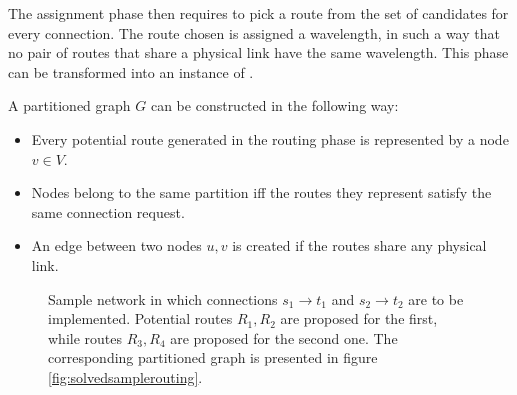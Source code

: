 The assignment phase then requires to pick a route from the set of candidates for every connection. The route chosen is assigned a wavelength, in such a way that no pair of routes that share a physical link have the same wavelength. This phase can be transformed into an instance of \PCP{}.

A partitioned graph $G$ can be constructed in the following way:
\begin{itemize}
\item{Every potential route generated in the routing phase is represented by a node $v \in V$.}
\item{Nodes belong to the same partition iff the routes they represent satisfy the same connection request.}
\item{An edge between two nodes $u,v$ is created if the routes share any physical link.}
\end{itemize}

\begin{figure}[h]
	
	\centering

		\caption{Sample network in which connections $s_1 \rightarrow t_1$ and $s_2 \rightarrow t_2$ are to be implemented. Potential routes $R_1, R_2$ are proposed for the first, while routes $R_3, R_4$ are proposed for the second one. The corresponding partitioned graph is presented in figure \ref{fig:solvedsamplerouting}.}
		
		\label{fig:samplerouting}
	\end{figure}
	
